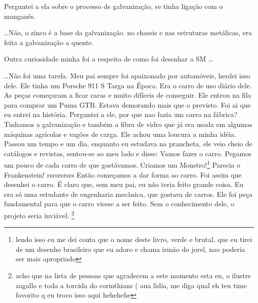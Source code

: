\documentclass[a4paper]{report}
\begin{document}
Perguntei a ela sobre o processo de galvaniza\c{c}\~ao, se tinha liga\c{c}\~ao com o mangan\^es. 

\dots N\~ao, o zinco \'e a base da galvaniza\c{c}\~ao. no chassis e nas estruturas met\'alicas, era feita a galvaniza\c{c}\~ao a quente.

Outra curiosidade minha foi a respeito de como foi desenhar a SM \dots

\dots N\~ao foi uma tarefa. Meu pai sempre foi apaixonado por autom\'oveis, herdei isso dele. Ele tinha um Porsche 911 S Targa na \'Epoca. Era o carro de uso di\'ario dele. As pe\c{c}as come\c{c}aram a ficar caras e muito dif\'iceis de conseguir. Ele entrou na fila para comprar um Puma GTB. Estava demorando mais que o previsto. Foi ai que eu entrei na hist\'oria. Perguntei a ele, por que nao fazia um carro na f\'abrica? 
Tinhamos a galvaniza\c{c}\~ao e tamb\'em a fibra de vidro que j\'a era usada em algumas m\'aquinas agr\'icolas e vag\~oes de carga. Ele achou uma loucura a minha id\'eia.
Passou um tempo e um dia, enquanto eu estudava na prancheta, ele veio cheio de cat\'alogos e revistas, sentou-se ao meu lado e disse: Vamos fazer o carro.
Pegamos um pouco de cada carro de que gost\'avamos. Criamos um Monstro!\footnote{lendo isso eu me dei conta que o nome deste livro, verde e brutal, que eu tirei de um desenho brasileiro que eu adoro e chama irm\~ao do jorel, nao poderia ser mais apropriado} 
Parecia o Frankenstein! rsrsrsrsrs
Ent\~ao come\c{c}amos a dar forma ao carro.
Foi assim que desenhei o carro. \'E claro que, sem meu pai, eu n\~ao teria feito grande coisa. Eu era s\'o uma estudante de engenharia mec\^anica, que gostava de carros. Ele foi pe\c{c}a fundamental para que o carro viesse a ser feito. Sem o conhecimento dele, o projeto seria invi\'avel. \footnote{acho que na lista de pessoas que agradecem a este momento esta eu, o ilustre zagallo e toda a torcida do corinthians ( ana lidia, me diga qual eh teu time favorito q eu troco isso aqui hehehehe }


\clearpage

\printindex
 
\end{document}
